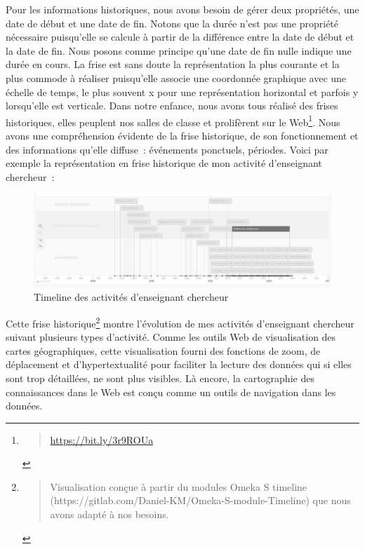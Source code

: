 \documentclass[
  letterpaper,
  DIV=11,
  numbers=noendperiod]{scrreprt}
\begin{document}
Pour les informations historiques, nous avons besoin de gérer deux
propriétés, une date de début et une date de fin. Notons que la durée
n'est pas une propriété nécessaire puisqu'elle se calcule à partir de la
différence entre la date de début et la date de fin. Nous posons comme
principe qu'une date de fin nulle indique une durée en cours. La frise
est sans doute la représentation la plus courante et la plus commode à
réaliser puisqu'elle associe une coordonnée graphique avec une échelle
de temps, le plus souvent x pour une représentation horizontal et
parfois y lorsqu'elle est verticale. Dans notre enfance, nous avons tous
réalisé des frises historiques, elles peuplent nos salles de classe et
prolifèrent sur le Web\footnote{\begin{quote}
  \url{https://bit.ly/3r9ROUa}
  \end{quote}}. Nous avons une compréhension évidente de la frise
historique, de son fonctionnement et des informations qu'elle diffuse~:
événements ponctuels, périodes. Voici par exemple la représentation en
frise historique de mon activité d'enseignant chercheur~:

\begin{figure}

{\centering \includegraphics{media/10000001000005060000019591922F8EA1A9F073.png}

}

\caption{\label{fig-timelineCvSamszo}Timeline des activités d'enseignant
chercheur}

\end{figure}

Cette frise historique\footnote{\begin{quote}
  Visualisation conçue à partir du modules Omeka S timeline
  (https://gitlab.com/Daniel-KM/Omeka-S-module-Timeline) que nous avons
  adapté à nos besoins.
  \end{quote}} montre l'évolution de mes activités d'enseignant
chercheur suivant plusieurs types d'activité. Comme les outils Web de
visualisation des cartes géographiques, cette visualisation fourni des
fonctions de zoom, de déplacement et d'hypertextualité pour faciliter la
lecture des données qui si elles sont trop détaillées, ne sont plus
visibles. Là encore, la cartographie des connaissances dans le Web est
conçu comme un outils de navigation dans les données.
\end{document}

